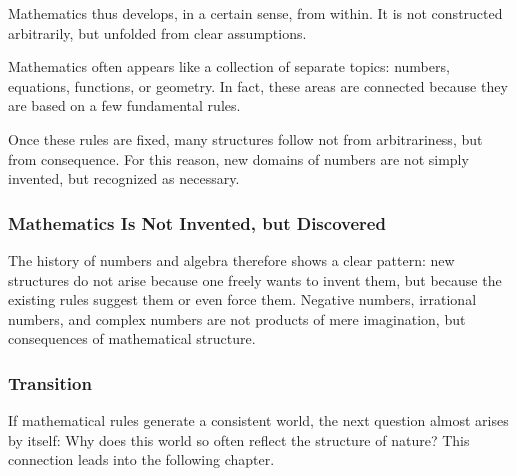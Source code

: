 Mathematics thus develops, in a certain sense, from within.
It is not constructed arbitrarily,
but unfolded from clear assumptions.

\begin{DidacticBox}
	\label{box:rules}
	Mathematics often appears like a collection of separate topics:
	numbers, equations, functions, or geometry.
	In fact, these areas are connected
	because they are based on a few fundamental rules.
	
	Once these rules are fixed,
	many structures follow not from arbitrariness,
	but from consequence.
	For this reason, new domains of numbers are not simply invented,
	but recognized as necessary.
\end{DidacticBox}

\subsubsection*{Mathematics Is Not Invented, but Discovered}
The history of numbers and algebra
therefore shows a clear pattern:
new structures do not arise
because one freely wants to invent them,
but because the existing rules suggest them or even force them.
Negative numbers, irrational numbers, and complex numbers
are not products of mere imagination,
but consequences of mathematical structure.

\subsubsection*{Transition}
If mathematical rules generate a consistent world,
the next question almost arises by itself:
Why does this world so often reflect the structure of nature?
This connection leads into the following chapter.